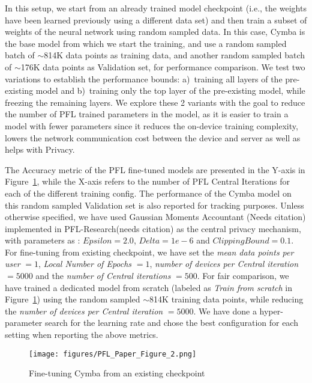 In this setup, we start from an already trained model checkpoint (i.e., the weights have been learned previously using a different data set) and then train a subset of weights of the neural network using random sampled data. 
In this case, Cymba is the base model from which we start the training, and use a random sampled batch of $\sim$814K data points as training data, and another random sampled batch of $\sim$176K data points as Validation set, for performance comparison.
We test two variations to establish the performance bounds: a)~training all layers of the pre-existing model and b)~training only the top layer of the pre-existing model, while freezing the remaining layers.
We explore these 2 variants with the goal to reduce the number of PFL trained parameters in the model, as it is easier to train a model with fewer parameters since it reduces the on-device training complexity, lowers the network communication cost between the device and server as well as helps with Privacy.

The Accuracy metric of the PFL fine-tuned models are presented in the Y-axis in Figure~\ref{fig:fine_tune_cymba}, while the X-axis refers to the number of PFL Central Iterations for each of the different training config.
The performance of the Cymba model on this random sampled Validation set is also reported for tracking purposes.
Unless otherwise specified, we have used Gaussian Moments Accountant (Needs citation) implemented in PFL-Research(needs citation) as the central privacy mechanism, with parameters as : $Epsilon = 2.0$, $Delta = 1e-6$ and $Clipping Bound = 0.1$. 
For fine-tuning from existing checkpoint, we have set the \textit{mean data points per user} $= 1$, \textit{Local Number of Epochs} $= 1$, \textit{number of devices per Central iteration} $= 5000$ and the \textit{number of Central iterations} $= 500$. 
For fair comparison, we have trained a dedicated model from scratch (labeled as \textit{Train from scratch} in Figure~\ref{fig:fine_tune_cymba}) using the random sampled $\sim$814K training data points, while reducing the \textit{number of devices per Central iteration} $= 5000$.
We have done a hyper-parameter search for the learning rate and chose the best configuration for each setting when reporting the above metrics.


\begin{figure}
\centering
\texttt{[image: figures/PFL\_Paper\_Figure\_2.png]}
\caption{Fine-tuning Cymba from an existing checkpoint}
\label{fig:fine_tune_cymba}
\end{figure}


